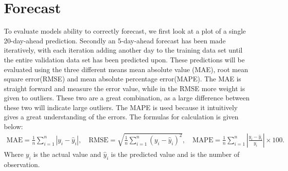 \section{Forecast}
To evaluate models ability to correctly forecast, we first look at a plot of a single 20-day-ahead prediction. Secondly an 5-day-ahead forecast has been made iteratively, with each iteration adding another day to the training data set until the entire validation data set has been predicted upon. These predictions will be evaluated using the three different means mean absolute value (MAE), root mean square error(RMSE) and mean absolute percentage error(MAPE). The MAE is straight forward and measure the error value, while in the RMSE more weight is given to outliers. These two are a great combination, as a large difference between these two will indicate large outliers. The MAPE is used because it intuitively gives a great understanding of the errors. The formulas for calculation is given below:
\begin{align*}
    \text{MAE} = \frac{1}{n} \sum_{i=1}^{n} |y_i - \hat{y}_i|, \quad \text{RMSE} = \sqrt{\frac{1}{n} \sum_{i=1}^{n} (y_i - \hat{y}_i)^2}, \quad \text{MAPE} = \frac{1}{n} \sum_{i=1}^{n} \left| \frac{y_i - \hat{y}_i}{y_i} \right| \times 100.
\end{align*}
\noindent Where $y_i$ is the actual value and $\hat{y}_i$ is the predicted value and is the number of observation.

